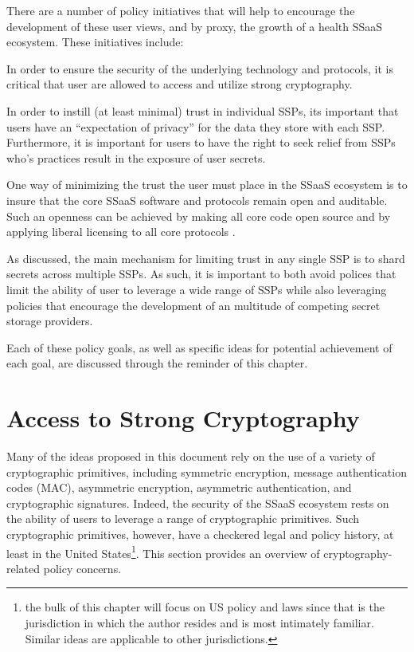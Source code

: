 There are a number of policy initiatives that will help to encourage
the development of these user views, and by proxy, the growth of a
health SSaaS ecosystem. These initiatives include:

\begin{packed_desc}
\item[Access to Strong Cryptography:] In order to ensure the security
  of the underlying technology and protocols, it is critical that user
  are allowed to access and utilize strong cryptography.
\item[SSP Privacy:] In order to instill (at least minimal) trust in
  individual SSPs, its important that users have an ``expectation of
  privacy'' for the data they store with each SSP. Furthermore, it is
  important for users to have the right to seek relief from SSPs who's
  practices result in the exposure of user secrets.
\item[Openness and Transparency:] One way of minimizing the trust the
  user must place in the SSaaS ecosystem is to insure that the core
  SSaaS software and protocols remain open and auditable. Such an
  openness can be achieved by making all core code open source and by
  applying liberal licensing to all core protocols .
\item[Use of Multiple SSPs:] As discussed, the main mechanism for
  limiting trust in any single SSP is to shard secrets across multiple
  SSPs. As such, it is important to both avoid polices that limit the
  ability of user to leverage a wide range of SSPs while also
  leveraging policies that encourage the development of an multitude
  of competing secret storage providers.
\end{packed_desc}

Each of these policy goals, as well as specific ideas for potential
achievement of each goal, are discussed through the reminder of this
chapter.

\section{Access to Strong Cryptography}
\label{chap:policy:crypto}

Many of the ideas proposed in this document rely on the use of a
variety of cryptographic primitives, including symmetric encryption,
message authentication codes (MAC), asymmetric encryption, asymmetric
authentication, and cryptographic signatures. Indeed, the security of
the SSaaS ecosystem rests on the ability of users to leverage a range
of cryptographic primitives. Such cryptographic primitives, however,
have a checkered legal and policy history, at least in the United
States\footnote{the bulk of this chapter will focus on US policy and
  laws since that is the jurisdiction in which the author resides and
  is most intimately familiar. Similar ideas are applicable to other
  jurisdictions.}. This section provides an overview of
cryptography-related policy concerns.

